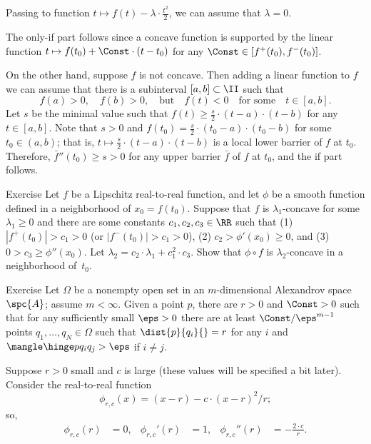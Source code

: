 Passing to function $t\mapsto f(t)-\lambda\cdot\tfrac{t^2}2$, we can assume that $\lambda=0$.

The only-if part follows since a concave function is supported by the linear function $t\mapsto f(t_0)+ \Const\cdot (t-t_0)$ for any $\Const\in [f^+(t_0),f^-(t_0)]$.

On the other hand, suppose $f$ is not concave.
Then adding a linear function to $f$ we can assume that there is a subinterval $[a,b]\subset\II$ such that
\[
f(a)>0,
\quad
f(b)>0,
\quad\text{but}\quad
f(t)<0
\quad\text{for some}\quad
t\in [a,b].
\]
Let $s$ be the minimal value such that $f(t)\ge \tfrac s2\cdot (t-a)\cdot(t-b)$ for any $t\in [a,b]$.
Note that $s>0$ and $f(t_0)=\tfrac s2\cdot (t_0-a)\cdot(t_0-b)$ for some $t_0\in (a,b)$;
that is, $t\mapsto \tfrac s2\cdot (t-a)\cdot(t-b)$ is a local lower barrier of $f$ at $t_0$.
Therefore, $\bar f''(t_0)\ge s>0$ for any upper barrier $\bar f$ of $f$ at $t_0$,
and the if part follows.
\qeds

\begin{thm}[!]{Exercise}\label{ex:barrier}
Let $f$ be a Lipschitz real-to-real function, and let $\phi$ be a smooth function defined in a neighborhood of $x_0=f(t_0)$.
Suppose that $f$ is $\lambda_1$-concave for some $\lambda_1\ge 0$ and there are some constants $c_1,c_2,c_3\in\RR$ such that (1) $|f^+(t_0)|>c_1>0$ (or $|f^-(t_0)|>c_1>0$), (2) $c_2>\phi'(x_0)\ge 0$, and (3) $0>c_3\ge \phi''(x_0)$.
Let $\lambda_2=c_2\cdot\lambda_1+c_1^2\cdot c_3$.
Show that $\phi\circ f$ is $\lambda_2$-concave in a neighborhood of~$t_0$.
\end{thm}

\begin{thm}[!]{Exercise}\label{ex:pack-sphere}
Let $\Omega$ be a nonempty open set in an $m$-dimensional Alexandrov space $\spc{A}$; assume $m<\infty$.
Given a point $p$, there are $r>0$ and $\Const>0$ such that for any sufficiently small $\eps>0$ there are at least $\Const/\eps^{m-1}$ points $q_1,\dots,q_N\in \Omega$ such that $\dist{p}{q_i}{}=r$ for any $i$ and $\mangle\hinge p{q_i}{q_j}>\eps$ if $i\ne j$.
\end{thm}


Suppose $r>0$ small and $c$ is large (these values will be specified a bit later).
Consider the real-to-real function
$$\phi_{r,c}(x)=(x-r)- c\cdot(x-r)^2/r;$$
so,
\begin{align*}
\phi_{r,c}(r)&=0,
&
\phi_{r,c}'(r)&=1,
&
\phi_{r,c}''(r)&=-\frac{2\cdot c}{r}.
\end{align*}

